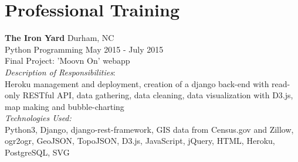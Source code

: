 \documentclass[11pt]{article}
\begin{document}
\section*{Professional Training}

{\bf The Iron Yard} \hfill Durham, NC\\
Python Programming \hfill {May 2015 - July 2015}
\vspace{5pt}\\
Final Project: 'Moovn On' webapp\\
{\it Description of Responsibilities}:\\
Heroku management and deployment, creation of a django back-end with read-only RESTful API, data gathering, data cleaning, data visualization with D3.js, map making and bubble-charting\\
{\it Technologies Used:}\\
Python3, Django, django-rest-framework, GIS data from Census.gov and Zillow, ogr2ogr, GeoJSON, TopoJSON, D3.js, JavaScript, jQuery, HTML, Heroku, PostgreSQL, SVG

\end{document}
